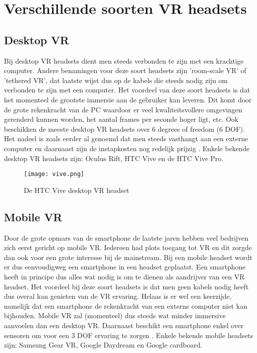 \section{Verschillende soorten VR headsets}

\subsection{Desktop VR}
Bij desktop VR headsets dient men steeds verbonden te zijn met een krachtige computer. Andere benamingen voor deze soort headsets zijn 'room-scale VR' of 'tethered VR', dat laatste wijst dus op de kabels die steeds nodig zijn om verbonden te zijn met een computer. Het voordeel van deze soort headsets is dat het momenteel de grootste immersie aan de gebruiker kan leveren. Dit komt door de grote rekenkracht van de PC waardoor er veel kwaliteitsvollere omgevingen gerenderd kunnen worden, het aantal frames per seconde hoger ligt, etc. Ook beschikken de meeste desktop VR headsets over 6 degrees of freedom (6 DOF). Het nadeel is zoals eerder al genoemd dat men steeds vasthangt aan een externe computer en daarnaast zijn de instapkosten nog redelijk prijzig \autocite{Cherdo2018}. Enkele bekende desktop VR headsets zijn: Oculus Rift, HTC Vive en de HTC Vive Pro.

\begin{figure}[h]
    \centering
    \texttt{[image: vive.png]}
    \caption{De HTC Vive desktop VR headset \autocite{Vive2019}}
\end{figure}


\subsection{Mobile VR}
Door de grote opmars van de smartphone de laatste jaren hebben veel bedrijven zich eerst gericht op mobile VR. Iedereen had plots toegang tot VR en dit zorgde dan ook voor een grote interesse bij de mainstream. Bij een mobile headset wordt er dus eenvoudigweg een smartphone in een headset geplaatst.
Een smartphone heeft in principe dus alles wat nodig is om te dienen als aandrijver van een VR headset. Het voordeel bij deze soort headsets is dat men geen kabels nodig heeft dus overal kan genieten van de VR ervaring. Helaas is er wel een keerzijde, namelijk dat een smartphone de rekenkracht van een externe computer niet kan bijhouden. Mobile VR zal (momenteel) dus steeds wat minder immersive aanvoelen dan een desktop VR. Daarnaast beschikt een smartphone enkel over sensoren om voor een 3 DOF ervaring te zorgen \autocite{Cherdo2018}.
Enkele bekende mobile headsets zijn: Samsung Gear VR, Google Daydream en Google cardboard.

